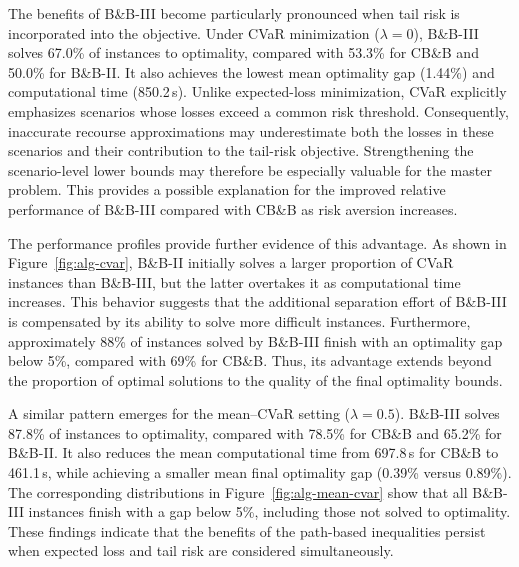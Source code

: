 \documentclass{itor}
\begin{document}
The benefits of B\&B-III become particularly pronounced when tail risk is incorporated into the objective. Under CVaR minimization ($\lambda=0$), B\&B-III solves 67.0\% of instances to optimality, compared with 53.3\% for CB\&B and 50.0\% for B\&B-II. It also achieves the lowest mean optimality gap (1.44\%) and computational time (850.2\,s). Unlike expected-loss minimization, CVaR explicitly emphasizes scenarios whose losses exceed a common risk threshold. Consequently, inaccurate recourse approximations may underestimate both the losses in these scenarios and their contribution to the tail-risk objective. Strengthening the scenario-level lower bounds may therefore be especially valuable for the master problem. This provides a possible explanation for the improved relative performance of B\&B-III compared with CB\&B as risk aversion increases.

The performance profiles provide further evidence of this advantage. As shown in Figure~\ref{fig:alg-cvar}, B\&B-II initially solves a larger proportion of CVaR instances than B\&B-III, but the latter overtakes it as computational time increases. This behavior suggests that the additional separation effort of B\&B-III is compensated by its ability to solve more difficult instances. Furthermore, approximately 88\% of instances solved by B\&B-III finish with an optimality gap below 5\%, compared with 69\% for CB\&B. Thus, its advantage extends beyond the proportion of optimal solutions to the quality of the final optimality bounds.

A similar pattern emerges for the mean--CVaR setting
($\lambda=0.5$). B\&B-III solves 87.8\% of instances to optimality, compared with 78.5\% for CB\&B and 65.2\% for B\&B-II. It also reduces the mean computational time from 697.8\,s for CB\&B to 461.1\,s, while achieving a smaller mean final optimality gap (0.39\% versus 0.89\%). The corresponding distributions in Figure~\ref{fig:alg-mean-cvar} show that all B\&B-III instances finish with a gap below 5\%, including those not solved to optimality. These findings indicate that the benefits of the path-based inequalities persist when expected loss and tail risk are considered simultaneously.

\end{document}
